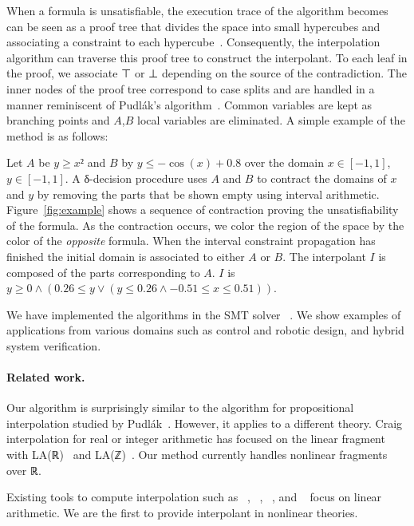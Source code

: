 When a formula is unsatisfiable, the execution trace of the algorithm becomes can be seen as a proof tree that divides the space into small hypercubes and associating a constraint to each hypercube~\cite{DBLP:conf/synasc/GaoKC14}. Consequently, the interpolation algorithm can traverse this proof tree to construct the interpolant. To each leaf in the proof, we associate ⊤ or ⊥ depending on the source of the contradiction. The inner nodes of the proof tree correspond to case splits and are handled in a manner reminiscent of Pudl{\'a}k's algorithm~\cite{MR1472134}. Common variables are kept as branching points and $A$,$B$ local variables are eliminated. A simple example of the method is as follows:

\begin{example}
Let $A$ be $y≥x²$ and $B$ by $y ≤ -\cos(x) + 0.8$ over the domain $x∈[-1,1]$, $y∈[-1,1]$.
A δ-decision procedure uses $A$ and $B$ to contract the domains of $x$ and $y$ by removing the parts that be shown empty using interval arithmetic.
Figure~\ref{fig:example} shows a sequence of contraction proving the unsatisfiability of the formula.
As the contraction occurs, we color the region of the space by the color of the \emph{opposite} formula.
When the interval constraint propagation has finished the initial domain is associated to either $A$ or $B$.
The interpolant $I$ is composed of the parts corresponding to $A$.
$I$ is $y ≥ 0 ∧ (0.26 ≤ y ∨ (y ≤ 0.26 ∧ -0.51 ≤ x ≤ 0.51))$.
\end{example}

We have implemented the algorithms in the SMT solver \dReal~\cite{DBLP:conf/cade/GaoKC13}. We show examples of applications from various domains such as control and robotic design, and hybrid system verification.  

\paragraph{Related work.}
Our algorithm is surprisingly similar to the algorithm for propositional interpolation studied by Pudl{\'a}k~\cite{MR1472134}.
However, it applies to a different theory.
Craig interpolation for real or integer arithmetic has focused on the linear fragment with LA(ℝ)~\cite{DBLP:conf/tacas/McMillan04,DBLP:conf/vmcai/RybalchenkoS07} and LA(ℤ)~\cite{DBLP:conf/cade/BrilloutKRW10,DBLP:conf/tacas/GriggioLS11}.
Our method currently handles nonlinear fragments over ℝ.

Existing tools to compute interpolation such as
\mathsat~\cite{mathsat5},
\princess~\cite{DBLP:conf/cade/BrilloutKRW10},
\smtinterpol~\cite{DBLP:conf/spin/ChristHN12}, and
\zthree~\cite{DBLP:conf/fmcad/McMillan11}
focus on linear arithmetic.
We are the first to provide interpolant in nonlinear theories.



